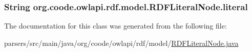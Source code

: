 \hypertarget{classorg_1_1coode_1_1owlapi_1_1rdf_1_1model_1_1_r_d_f_literal_node_aa6ab079c5e807c54becb6cfd2711d1c3}{
\subsubsection[{literal}]{\setlength{\rightskip}{0pt plus 5cm}String org.\-coode.\-owlapi.\-rdf.\-model.\-R\-D\-F\-Literal\-Node.\-literal\hspace{0.3cm}{\ttfamily [private]}}}\label{classorg_1_1coode_1_1owlapi_1_1rdf_1_1model_1_1_r_d_f_literal_node_aa6ab079c5e807c54becb6cfd2711d1c3}


The documentation for this class was generated from the following file\-:\begin{DoxyCompactItemize}
\item 
parsers/src/main/java/org/coode/owlapi/rdf/model/\hyperlink{_r_d_f_literal_node_8java}{R\-D\-F\-Literal\-Node.\-java}\end{DoxyCompactItemize}
